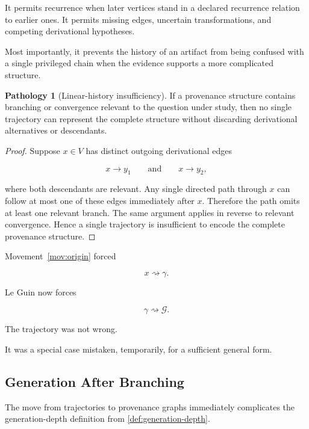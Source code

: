 \documentclass[
  11pt,
  a4paper,
  DIV=12,
  BCOR=0mm,
  parskip=half-
]{scrartcl}
\newcommand{\graphG}{\mathcal G}
\theoremstyle{definition}
\newtheorem{pathology}[definition]{Pathology}
\theoremstyle{plain}
\theoremstyle{remark}
\begin{document}
It permits recurrence when later vertices stand in a declared recurrence
relation to earlier ones. It permits missing edges, uncertain transformations,
and competing derivational hypotheses.

Most importantly, it prevents the history of an artifact from being confused
with a single privileged chain when the evidence supports a more complicated
structure.

\begin{pathology}[Linear-history insufficiency]
\label{path:linear-history}
If a provenance structure contains branching or convergence relevant to the
question under study, then no single trajectory can represent the complete
structure without discarding derivational alternatives or descendants.
\end{pathology}

\begin{proof}
Suppose \(x\in V\) has distinct outgoing derivational edges

\[
  x\to y_1
  \qquad\text{and}\qquad
  x\to y_2,
\]

where both descendants are relevant. Any single directed path through \(x\)
can follow at most one of these edges immediately after \(x\). Therefore the
path omits at least one relevant branch. The same argument applies in reverse
to relevant convergence. Hence a single trajectory is insufficient to encode
the complete provenance structure.
\end{proof}

Movement~\ref{mov:origin} forced

\[
  x
  \rightsquigarrow
  \gamma.
\]

Le Guin now forces

\[
  \gamma
  \rightsquigarrow
  \graphG.
\]

The trajectory was not wrong.

It was a special case mistaken, temporarily, for a sufficient general form.


\subsection{Generation After Branching}
\label{sec:generation-branching}

The move from trajectories to provenance graphs immediately complicates the
generation-depth definition from \cref{def:generation-depth}.
\end{document}

